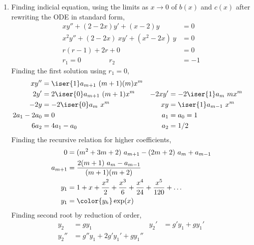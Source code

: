 \begin{enumerate}
    \item Finding indicial equation, using the limits as $ x \to 0 $
          of $ b(x) $ and $ c(x) $ after rewriting the ODE in standard form,
          \begin{align}
              xy'' + (2-2x)y' + (x-2)y               & = 0  \\
              x^2y'' + (2 - 2x)\ xy' + (x^2 - 2x)\ y & = 0  \\
              r(r-1) + 2r + 0                        & = 0  \\
              r_1 = 0 \qquad\qquad r_2               & = -1
          \end{align}
          Finding the first solution using $ r_1 = 0 $,
          \begin{align}
              xy''        & = \iser{1}a_{m+1}\ (m+1)(m)x^{m} & \\
              2y'         & = 2\iser{0}a_{m+1}\ (m+1) x^{m}  &
              -2xy'       & = -2\iser{1}a_m\ m x^{m}           \\
              -2y         & = -2\iser{0}a_{m}\ x^{m}         &
              xy          & = \iser{1}a_{m-1}\ x^{m}           \\
              2a_1 - 2a_0 & = 0                              &
              a_1         & = a_0 = 1                          \\
              6a_2        & = 4a_1 - a_0                     &
              a_2         & = 1/2
          \end{align}
          Finding the recursive relation for higher coefficients,
          \begin{align}
              0       & = (m^2+ 3m + 2)\ a_{m+1} - (2m + 2)\ a_m + a_{m-1}         \\
              a_{m+1} & = \frac{2(m+1)\ a_m - a_{m-1}}{(m+1)(m+2)}                 \\
              y_1     & =  1  + x + \frac{x^2}{2} + \frac{x^3}{6} + \frac{x^4}{24}
              + \frac{x^5}{120} + \dots                                            \\
              y_1     & = \color{y_h} \exp(x)
          \end{align}
          Finding second root by reduction of order,
          \begin{align}
              y_2       & = gy_1                              &
              y_2'      & = g'y_1 + gy_1'                       \\
              y_2''     & = g''y_1 + 2g'y_1' + gy_1''           \\

\end{align}
\end{enumerate}
